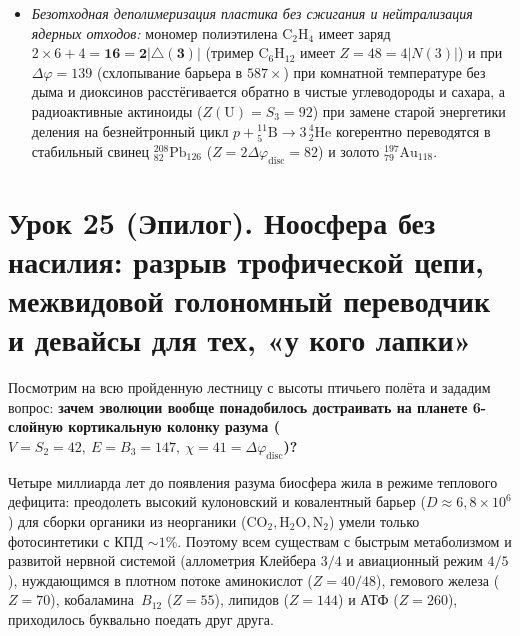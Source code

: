 \begin{enumerate}[label=\textbf{\arabic*.},leftmargin=*]
\begin{itemize}[noitemsep]
    молекула озона $\mathrm{O_3}$ несёт заряд $Z(\mathrm{O_3}) = 3\times 8 = \mathbf{24 = 2|N(3)|}$ (точное число поверхностных рёбер кубооктаэдра $O_2$, $3\,\mathrm{O_2}\ (48) \leftrightarrow 2\,\mathrm{O_3}\ (48)$) и синтезируется на четверть-оборотном мосту $\Delta\varphi = 128$ без искрового пробоя и без токсичных оксидов азота $\mathrm{NO_x}$, а озоноразрушающие радикалы хлора $Z(\mathrm{Cl}) = 17$ и фтора $Z(\mathrm{F}) = 9$ из расщеплённых при $\Delta\varphi = 139$ фреонов связываются натрием ($Z=11$) и кальцием ($Z=20$) в инертные минеральные оболочки галита $\mathrm{NaCl}$ ($11+17 = \mathbf{28}$) и флюорита $\mathrm{CaF_2}$ ($20 + 2\times 9 = \mathbf{38 = 2\times 19}$);
  \item \emph{Безотходная деполимеризация пластика без сжигания и нейтрализация ядерных отходов:}
    мономер полиэтилена $\mathrm{C_2H_4}$ имеет заряд $2\times 6 + 4 = \mathbf{16 = 2|{\triangle}(3)|}$ (тример $\mathrm{C_6H_{12}}$ имеет $Z = 48 = 4|N(3)|$) и при $\Delta\varphi = 139$ (схлопывание барьера в $587\times$) при комнатной температуре без дыма и диоксинов расстёгивается обратно в чистые углеводороды и сахара, а радиоактивные актиноиды ($Z(\mathrm{U}) = S_3 = 92$) при замене старой энергетики деления на безнейтронный цикл $p + {}^{11}_5\mathrm{B}\to 3\,{}^4_2\mathrm{He}$ когерентно переводятся в стабильный свинец $^{208}_{82}\mathrm{Pb}_{126}$ ($Z = 2\Delta\varphi_{\mathrm{disc}} = 82$) и золото $^{197}_{79}\mathrm{Au}_{118}$.
  \end{itemize}
\end{enumerate}

\section{Урок 25 (Эпилог). Ноосфера без насилия: разрыв трофической цепи, межвидовой голономный переводчик и девайсы для тех, «у кого лапки»}

Посмотрим на всю пройденную лестницу с высоты птичьего полёта и зададим вопрос: \textbf{зачем эволюции вообще понадобилось достраивать на планете 6-слойную кортикальную колонку разума ($V = S_2 = 42,\ E = B_3 = 147,\ \chi = 41 = \Delta\varphi_{\mathrm{disc}}$)?}

Четыре миллиарда лет до появления разума биосфера жила в режиме теплового дефицита: преодолеть высокий кулоновский и ковалентный барьер ($D \approx 6{,}8\times 10^6$) для сборки органики из неорганики ($\mathrm{CO_2, H_2O, N_2}$) умели только фотосинтетики с КПД $\sim 1\%$. Поэтому всем существам с быстрым метаболизмом и развитой нервной системой (аллометрия Клейбера $3/4$ и авиационный режим $4/5$), нуждающимся в плотном потоке аминокислот ($Z=40/48$), гемового железа ($Z=70$), кобаламина~$B_{12}$ ($Z=55$), липидов ($Z=144$) и АТФ ($Z=260$), приходилось буквально поедать друг друга.

